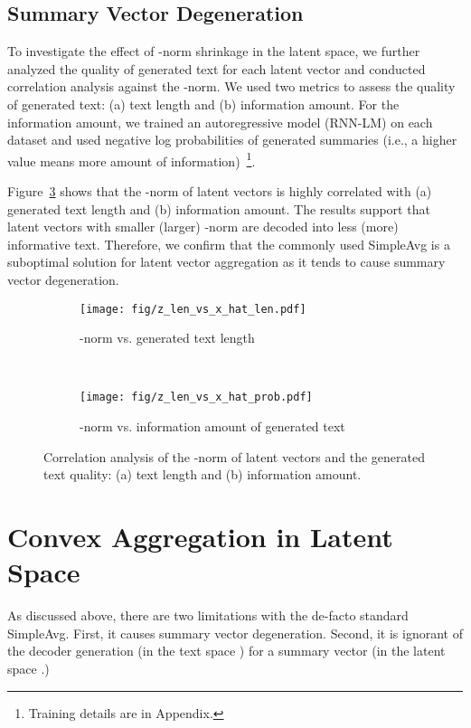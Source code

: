 \documentclass[11pt]{article}
\newcommand{\simpleavg}{\mbox{SimpleAvg}}
\newcommand{\hl}[1]{#1}
\begin{document}
\subsection{Summary Vector Degeneration}
\label{sub:embed_center}

To investigate the effect of -norm shrinkage in the latent space, we further analyzed the quality of generated text for each latent vector and conducted correlation analysis against the -norm. 
We used two metrics to assess the quality of generated text: (a) text length and (b) information amount. For the information amount, we trained an autoregressive model (RNN-LM) on each dataset and used negative log probabilities of generated summaries (i.e., a higher value means more amount of information)~\cite{brown-etal-1992-estimate,mielke-etal-2019-kind}\footnote{Training details are in Appendix.}.

Figure~\ref{fig:z_analysis} shows that the -norm of latent vectors is highly correlated with (a) generated text length and (b) information amount.
The results support that latent vectors with smaller (larger) -norm are decoded into less (more) informative text.
Therefore, we confirm that the commonly used \simpleavg{} is a suboptimal solution for latent vector aggregation as it tends to cause
summary vector degeneration.

\begin{figure}[t]
    \centering
    \begin{subfigure}[b]{\linewidth}
        \centering
        \texttt{[image: fig/z\_len\_vs\_x\_hat\_len.pdf]}
        \caption{-norm vs. generated text length}
        \label{fig:z_x}
    \end{subfigure}
    ~\hfill
    \begin{subfigure}[b]{\linewidth}
        \centering
        \texttt{[image: fig/z\_len\_vs\_x\_hat\_prob.pdf]}
        \caption{-norm vs. information amount of generated text}
        \label{fig:z_prob}
    \end{subfigure}
    \caption{Correlation analysis of the -norm of latent vectors  and the generated text quality: (a) text length and (b) information amount.}
    \label{fig:z_analysis}
\end{figure}

\section{Convex Aggregation in Latent Space}\label{sec:agg}
\hl{As discussed above, there are two limitations} with the de-facto standard \simpleavg. First, it causes summary vector degeneration. Second, it is ignorant of the decoder generation (in the text space ) for a summary vector (in the latent space .)
\end{document}
